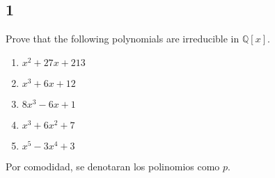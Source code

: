 \documentclass[11pt]{article}
\newcommand{\set}[1]{\mathbb{#1}}
\theoremstyle{definition}
\begin{document}
    \subsection{1}
    Prove that the following polynomials are irreducible in $\set{Q}[x]$.
    \begin{enumerate}[label=\textbf{(\alph*)}]
        \item $x^2+27x+213$

        \item $x^3+6x+12$

        \item $8x^3-6x+1$

        \item $x^3+6x^2+7$

        \item $x^5-3x^4+3$
    \end{enumerate}
    Por comodidad, se denotaran los polinomios como $p$.
\end{document}
